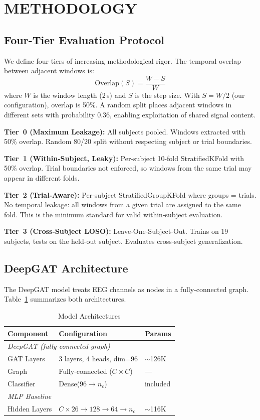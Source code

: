 \documentclass[a4paper, 10pt, conference]{ieeeconf}
\begin{document}
\section{METHODOLOGY}

\subsection{Four-Tier Evaluation Protocol}

We define four tiers of increasing methodological rigor. The temporal overlap between adjacent windows is:
\begin{equation}
    \text{Overlap}(S) = \frac{W - S}{W}
\end{equation}
where $W$ is the window length (2\,s) and $S$ is the step size. With $S = W/2$ (our configuration), overlap is 50\%. A random split places adjacent windows in different sets with probability 0.36, enabling exploitation of shared signal content.

\textbf{Tier~0 (Maximum Leakage):} All subjects pooled. Windows extracted with 50\% overlap. Random 80/20 split without respecting subject or trial boundaries.

\textbf{Tier~1 (Within-Subject, Leaky):} Per-subject 10-fold StratifiedKFold with 50\% overlap. Trial boundaries not enforced, so windows from the same trial may appear in different folds.

\textbf{Tier~2 (Trial-Aware):} Per-subject StratifiedGroupKFold where groups = trials. No temporal leakage: all windows from a given trial are assigned to the same fold. This is the minimum standard for valid within-subject evaluation.

\textbf{Tier~3 (Cross-Subject LOSO):} Leave-One-Subject-Out. Trains on 19 subjects, tests on the held-out subject. Evaluates cross-subject generalization.

\subsection{DeepGAT Architecture}

The DeepGAT model treats EEG channels as nodes in a fully-connected graph. Table~\ref{tab:arch} summarizes both architectures.

\begin{table}[t]
\centering
\caption{Model Architectures}
\label{tab:arch}
\begin{tabular}{lll}
\toprule
Component & Configuration & Params \\
\midrule
\multicolumn{3}{l}{\textit{DeepGAT (fully-connected graph)}} \\
GAT Layers & 3 layers, 4 heads, dim=96 & $\sim$126K \\
Graph & Fully-connected ($C{\times}C$) & --- \\
Classifier & Dense($96{\to}n_c$) & included \\
\midrule
\multicolumn{3}{l}{\textit{MLP Baseline}} \\
Hidden Layers & $C{\times}26 \to 128 \to 64 \to n_c$ & $\sim$116K \\
\bottomrule
\end{tabular}
\end{table}
\end{document}
